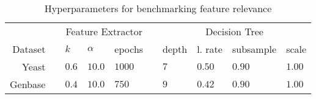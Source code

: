 \begin{table}[!h]
%
\centering
\caption{Hyperparameters for benchmarking feature relevance}
%
\begin{tabular}{@{}r*{9}{l}@{}}
\toprule
        && \multicolumn{3}{c}{Feature Extractor} && \multicolumn{4}{c}{Decision Tree} \\ \cmidrule{3-5} \cmidrule{7-10}
Dataset && $k$   & $\alpha$ & epochs && depth & l. rate & subsample & scale   \\\midrule
Yeast   && $0.6$ & $10.0$   & $1000$ && $7$   & $0.50$  & $0.90$    & $1.00$  \\
Genbase && $0.4$ & $10.0$   & $750$  && $9$   & $0.42$  & $0.90$    & $1.00$  \\\bottomrule
\end{tabular}
\end{table}

